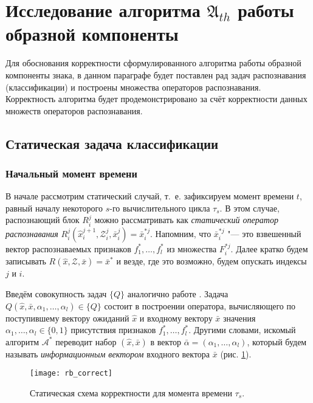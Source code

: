 \section{Исследование алгоритма $\mathfrak A_{th}$ работы образной компоненты}\label{sect3_2}

Для обоснования корректности сформулированного алгоритма работы образной компоненты знака, в данном параграфе будет поставлен рад задач распознавания (классификации) и построены множества операторов распознавания. Корректность алгоритма будет продемонстрировано за счёт корректности данных множеств операторов распознавания.

\subsection{Статическая задача классификации}

\subsubsection{Начальный момент времени}
В начале рассмотрим статический случай, т.~е. зафиксируем момент времени $t$, равный началу некоторого $s$-го вычислительного цикла $\tau_s$. В этом случае, распознающий блок $R_i^j$ можно рассматривать как \textit{статический оператор распознавания} $R_i^j(\hat{x}_i^{j+1},\mathcal{Z}_i^j,\bar{x}_i^j)=\bar{x}_i^{*j}$. Напомним, что $\bar{x}_i^{*j}$ "--- это взвешенный вектор распознаваемых признаков $f_1^*,\dots,f_l^*$ из множества $F_i^{*j}$. Далее кратко будем записывать $R(\hat{x},\mathcal{Z},\bar{x})=\bar{x}^*$ и везде, где это возможно, будем опускать индексы $j$ и $i$.
	
Введём совокупность задач $\{Q\}$ аналогично работе \cite{Zhuravlev1977,ZhuravlevE1977}. Задача $Q(\hat{x},\bar{x},\alpha_1,\dots,\alpha_l)\in\{Q\}$ состоит в построении оператора, вычисляющего по поступившему вектору ожиданий $\hat{x}$ и входному вектору $\bar{x}$ значения $\alpha_1,\dots,\alpha_l\in\{0,1\}$ присутствия признаков $f_1^*,\dots,f_l^*$. Другими словами, искомый алгоритм $\mathcal{A}^*$ переводит набор $(\hat{x},\bar{x})$ в вектор $\bar{\alpha}=(\alpha_1,\dots,\alpha_l)$, который будем называть \textit{информационным вектором} входного вектора $\bar{x}$ (рис. \ref{fig:rb_correct_stat0}).
	
\begin{figure}[h]
	\centering
	\texttt{[image: rb\_correct]}
	\caption{Статическая схема корректности для момента времени $\tau_s$.}
	\label{fig:rb_correct_stat0}
\end{figure}

